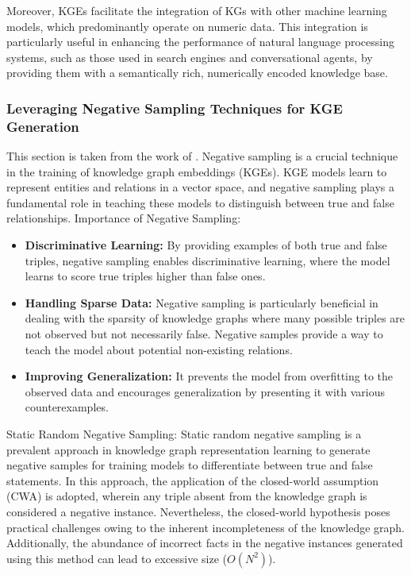 \documentclass[12pt]{article}
\begin{document}
Moreover, KGEs facilitate the integration of KGs with other machine learning models, which predominantly operate on numeric data. This integration is particularly useful in enhancing the performance of natural language processing systems, such as those used in search engines and conversational agents, by providing them with a semantically rich, numerically encoded knowledge base.

\subsubsection{Leveraging Negative Sampling Techniques for KGE Generation}
This section is taken from the work of \textcite{madushanka2024negative}.
Negative sampling is a crucial technique in the training of knowledge graph embeddings (KGEs). KGE models learn to represent entities and relations in a vector space, and negative sampling plays a fundamental role in teaching these models to distinguish between true and false relationships. 
Importance of Negative Sampling: 
\begin{itemize}
    \item \textbf{Discriminative Learning:} By providing examples of both true and false triples, negative sampling enables discriminative learning, where the model learns to score true triples higher than false ones.
    \item \textbf{Handling Sparse Data:} Negative sampling is particularly beneficial in dealing with the sparsity of knowledge graphs where many possible triples are not observed but not necessarily false. Negative samples provide a way to teach the model about potential non-existing relations.
    \item \textbf{Improving Generalization:} It prevents the model from overfitting to the observed data and encourages generalization by presenting it with various counterexamples.
\end{itemize}

Static Random Negative Sampling:
Static random negative sampling is a prevalent approach in knowledge graph representation learning to generate negative samples for training models to differentiate between true and false statements. In this approach, the application of the closed-world assumption (CWA) is adopted, wherein any triple absent from the knowledge graph is considered a negative instance. Nevertheless, the closed-world hypothesis poses practical challenges owing to the inherent incompleteness of the knowledge graph. Additionally, the abundance of incorrect facts in the negative instances generated using this method can lead to excessive size (\(O(N^2)\)).
\end{document}
